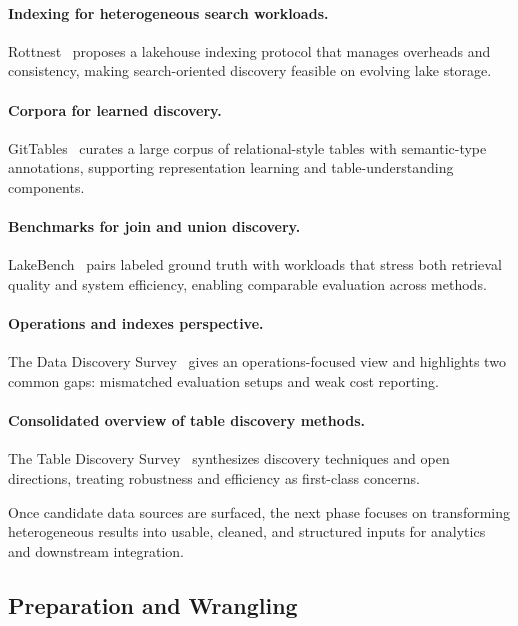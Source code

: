 \documentclass[sigconf,nonacm]{acmart}
\begin{document}
\paragraph{Indexing for heterogeneous search workloads.}
Rottnest~\cite{11113229} proposes a lakehouse indexing protocol that manages overheads and consistency, making search-oriented discovery feasible on evolving lake storage.

\paragraph{Corpora for learned discovery.}
GitTables~\cite{10.1145/3588710} curates a large corpus of relational-style tables with semantic-type annotations, supporting representation learning and table-understanding components.

\paragraph{Benchmarks for join and union discovery.}
LakeBench~\cite{10.14778/3659437.3659448} pairs labeled ground truth with workloads that stress both retrieval quality and system efficiency, enabling comparable evaluation across methods.

\paragraph{Operations and indexes perspective.}
The Data Discovery Survey~\cite{10.14778/3750601.3750694} gives an operations-focused view and highlights two common gaps: mismatched evaluation setups and weak cost reporting.

\paragraph{Consolidated overview of table discovery methods.}
The Table Discovery Survey~\cite{10.1145/3555041.3589409} synthesizes discovery techniques and open directions, treating robustness and efficiency as first-class concerns.

Once candidate data sources are surfaced, the next phase focuses on transforming heterogeneous results into usable, cleaned, and structured inputs for analytics and downstream integration.


\subsection{Preparation and Wrangling}
\end{document}
